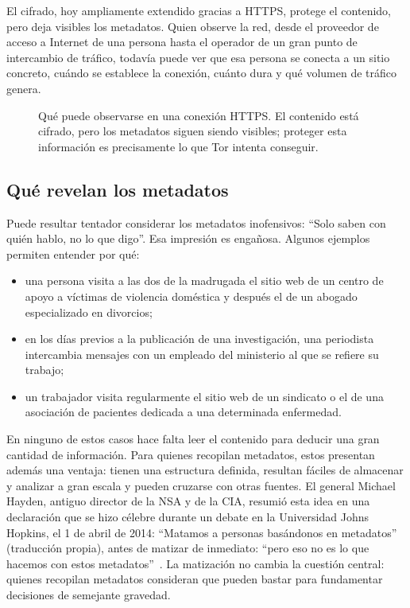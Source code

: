 El cifrado, hoy ampliamente extendido gracias a HTTPS, protege el contenido, pero deja visibles los metadatos. Quien observe la red, desde el proveedor de acceso a Internet de una persona hasta el operador de un gran punto de intercambio de tráfico, todavía puede ver que esa persona se conecta a un sitio concreto, cuándo se establece la conexión, cuánto dura y qué volumen de tráfico genera.

\begin{figure}[htbp]
\centering

\caption{Qué puede observarse en una conexión HTTPS. El contenido está cifrado, pero los metadatos siguen siendo visibles; proteger esta información es precisamente lo que Tor intenta conseguir.}
\label{fig:metadati}
\end{figure}

\subsection{Qué revelan los metadatos}

Puede resultar tentador considerar los metadatos inofensivos: \enquote{Solo saben con quién hablo, no lo que digo}. Esa impresión es engañosa. Algunos ejemplos permiten entender por qué:
\begin{itemize}
  \item una persona visita a las dos de la madrugada el sitio web de un centro de apoyo a víctimas de violencia doméstica y después el de un abogado especializado en divorcios;
  \item en los días previos a la publicación de una investigación, una periodista intercambia mensajes con un empleado del ministerio al que se refiere su trabajo;
  \item un trabajador visita regularmente el sitio web de un sindicato o el de una asociación de pacientes dedicada a una determinada enfermedad.
\end{itemize}

En ninguno de estos casos hace falta leer el contenido para deducir una gran cantidad de información. Para quienes recopilan metadatos, estos presentan además una ventaja: tienen una estructura definida, resultan fáciles de almacenar y analizar a gran escala y pueden cruzarse con otras fuentes. El general Michael Hayden, antiguo director de la NSA y de la CIA, resumió esta idea en una declaración que se hizo célebre durante un debate en la Universidad Johns Hopkins, el 1 de abril de 2014: \enquote{Matamos a personas basándonos en metadatos} (traducción propia), antes de matizar de inmediato: \enquote{pero eso no es lo que hacemos con estos metadatos}~\cite{hayden2014metadata}. La matización no cambia la cuestión central: quienes recopilan metadatos consideran que pueden bastar para fundamentar decisiones de semejante gravedad.

